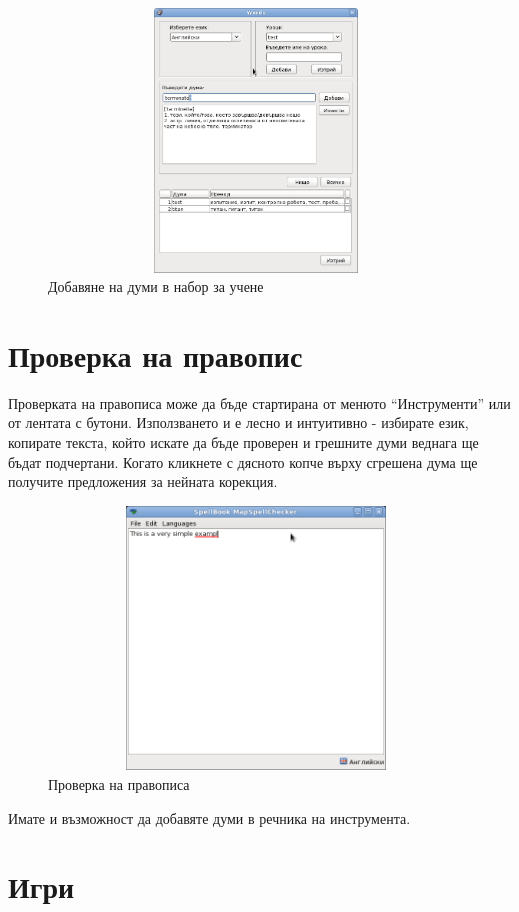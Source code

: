 \begin{figure}[htbp]
  \caption{Добавяне на думи в набор за учене}
  \centering
  \includegraphics[width=110mm, height=70mm]{images/add_to_study_set.png}
\end{figure}

\section{Проверка на правопис}
Проверката на правописа може да бъде стартирана от менюто
"`Инструменти"' или от лентата с бутони. Използването и е лесно и
интуитивно - избирате език, копирате текста, който искате да бъде
проверен и грешните думи веднага ще бъдат подчертани. Когато кликнете
с дясното копче върху сгрешена дума ще получите предложения за нейната
корекция. 

\begin{figure}[htbp]
  \caption{Проверка на правописа}
  \centering
  \includegraphics[width=110mm, height=70mm]{images/spellcheck_frame.png}
\end{figure}

Имате и възможност да добавяте думи в речника на инструмента.

\section{Игри}
